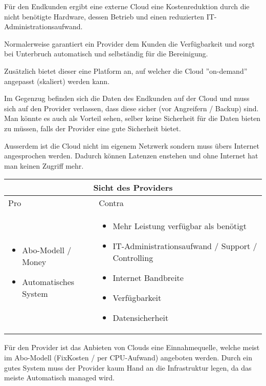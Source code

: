 \documentclass[11pt,titlepage]{article}
\begin{document}
Für den Endkunden ergibt eine externe Cloud eine Kostenreduktion durch die nicht benötigte Hardware, dessen Betrieb und einen reduzierten IT-Administrationsaufwand. 

Normalerweise garantiert ein Provider dem Kunden die Verfügbarkeit und sorgt bei Unterbruch automatisch und selbständig für die Bereinigung.

Zusätzlich bietet dieser eine Platform an, auf welcher die Cloud ''on-demand'' angepasst (skaliert) werden kann.

\par\medskip

Im Gegenzug befinden sich die Daten des Endkunden auf der Cloud und muss sich auf den Provider verlassen, dass diese sicher (vor Angreifern / Backup) sind. Man könnte es auch als Vorteil sehen, selber keine Sicherheit für die Daten bieten zu müssen, falls der Provider eine gute Sicherheit bietet.

Ausserdem ist die Cloud nicht im eigenem Netzwerk sondern muss übers Internet angesprochen werden. Dadurch können Latenzen enstehen und ohne Internet hat man keinen Zugriff mehr.

\par\medskip\medskip

\begin{tabular}{ |p{7cm}|p{7cm}|  }
  \hline
  \multicolumn{2}{|c|}{Sicht des Providers} \\
  \hline
  Pro & Contra \\
  \hline
  \begin{itemize}
    \item Abo-Modell / Money
    \item Automatisches System
  \end{itemize}
  & 
  \begin{itemize}
    \item Mehr Leistung verfügbar als benötigt
    \item IT-Administrationsaufwand / Support / Controlling
    \item Internet Bandbreite
    \item Verfügbarkeit
    \item Datensicherheit
  \end{itemize}
  \\
  \hline
\end{tabular}

\par\medskip

Für den Provider ist das Anbieten von Clouds eine Einnahmequelle, welche meist im Abo-Modell (FixKosten / per CPU-Aufwand) angeboten werden.
Durch ein gutes System muss der Provider kaum Hand an die Infrastruktur legen, da das meiste Automatisch managed wird.
\end{document}
